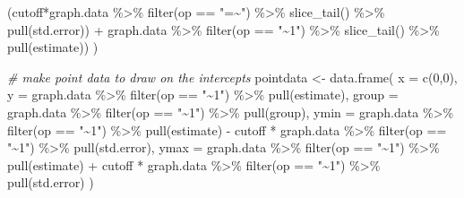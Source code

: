 \documentclass[
  man]{apa7}
\newenvironment{Shaded}{\begin{snugshade}}{\end{snugshade}}
\newcommand{\AttributeTok}[1]{\textcolor[rgb]{0.77,0.63,0.00}{#1}}
\newcommand{\CommentTok}[1]{\textcolor[rgb]{0.56,0.35,0.01}{\textit{#1}}}
\newcommand{\DecValTok}[1]{\textcolor[rgb]{0.00,0.00,0.81}{#1}}
\newcommand{\FunctionTok}[1]{\textcolor[rgb]{0.00,0.00,0.00}{#1}}
\newcommand{\NormalTok}[1]{#1}
\newcommand{\OtherTok}[1]{\textcolor[rgb]{0.56,0.35,0.01}{#1}}
\newcommand{\SpecialCharTok}[1]{\textcolor[rgb]{0.00,0.00,0.00}{#1}}
\newcommand{\StringTok}[1]{\textcolor[rgb]{0.31,0.60,0.02}{#1}}
\begin{document}
\begin{Shaded}
\begin{Highlighting}[]
\NormalTok{               (cutoff}\SpecialCharTok{*}\NormalTok{graph.data }\SpecialCharTok{\%\textgreater{}\%} \FunctionTok{filter}\NormalTok{(op }\SpecialCharTok{==} \StringTok{"=\textasciitilde{}"}\NormalTok{) }\SpecialCharTok{\%\textgreater{}\%} 
                      \FunctionTok{slice\_tail}\NormalTok{() }\SpecialCharTok{\%\textgreater{}\%} \FunctionTok{pull}\NormalTok{(std.error)) }\SpecialCharTok{+}
\NormalTok{               graph.data }\SpecialCharTok{\%\textgreater{}\%} \FunctionTok{filter}\NormalTok{(op }\SpecialCharTok{==} \StringTok{"\textasciitilde{}1"}\NormalTok{) }\SpecialCharTok{\%\textgreater{}\%} 
                   \FunctionTok{slice\_tail}\NormalTok{() }\SpecialCharTok{\%\textgreater{}\%} \FunctionTok{pull}\NormalTok{(estimate))}
\NormalTok{  )}
  
  \CommentTok{\# make point data to draw on the intercepts }
\NormalTok{  pointdata }\OtherTok{\textless{}{-}} \FunctionTok{data.frame}\NormalTok{(}
  \AttributeTok{x =} \FunctionTok{c}\NormalTok{(}\DecValTok{0}\NormalTok{,}\DecValTok{0}\NormalTok{),}
  \AttributeTok{y =}\NormalTok{ graph.data }\SpecialCharTok{\%\textgreater{}\%} \FunctionTok{filter}\NormalTok{(op }\SpecialCharTok{==} \StringTok{"\textasciitilde{}1"}\NormalTok{) }\SpecialCharTok{\%\textgreater{}\%} \FunctionTok{pull}\NormalTok{(estimate), }
  \AttributeTok{group =}\NormalTok{ graph.data }\SpecialCharTok{\%\textgreater{}\%} \FunctionTok{filter}\NormalTok{(op }\SpecialCharTok{==} \StringTok{"\textasciitilde{}1"}\NormalTok{) }\SpecialCharTok{\%\textgreater{}\%} \FunctionTok{pull}\NormalTok{(group),}
  \AttributeTok{ymin =}\NormalTok{ graph.data }\SpecialCharTok{\%\textgreater{}\%} \FunctionTok{filter}\NormalTok{(op }\SpecialCharTok{==} \StringTok{"\textasciitilde{}1"}\NormalTok{) }\SpecialCharTok{\%\textgreater{}\%} \FunctionTok{pull}\NormalTok{(estimate) }\SpecialCharTok{{-}} 
\NormalTok{    cutoff }\SpecialCharTok{*}\NormalTok{ graph.data }\SpecialCharTok{\%\textgreater{}\%} \FunctionTok{filter}\NormalTok{(op }\SpecialCharTok{==} \StringTok{"\textasciitilde{}1"}\NormalTok{) }\SpecialCharTok{\%\textgreater{}\%} \FunctionTok{pull}\NormalTok{(std.error), }
  \AttributeTok{ymax =}\NormalTok{ graph.data }\SpecialCharTok{\%\textgreater{}\%} \FunctionTok{filter}\NormalTok{(op }\SpecialCharTok{==} \StringTok{"\textasciitilde{}1"}\NormalTok{) }\SpecialCharTok{\%\textgreater{}\%} \FunctionTok{pull}\NormalTok{(estimate) }\SpecialCharTok{+} 
\NormalTok{    cutoff }\SpecialCharTok{*}\NormalTok{ graph.data }\SpecialCharTok{\%\textgreater{}\%} \FunctionTok{filter}\NormalTok{(op }\SpecialCharTok{==} \StringTok{"\textasciitilde{}1"}\NormalTok{) }\SpecialCharTok{\%\textgreater{}\%} \FunctionTok{pull}\NormalTok{(std.error)}
\NormalTok{  )}
  

\end{Highlighting}
\end{Shaded}
\end{document}
